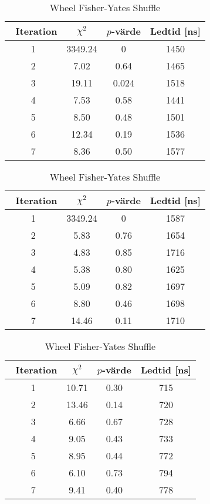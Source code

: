\begin{table}[H]
	\vspace{2em}

	\begin{subtable}[h]{0.45\textwidth}
		\centering
		\caption{\gls{soc} Pile Shuffle}
		\label{tab:soc}
		\begin{tabular}{c|c|c|c}
			$\phantom{\bigg|}$ Iteration & $\chi^2$  & \(p\)-värde & Ledtid [ns]

			\\ \hline \hline
			1 & 3349.24 & 0 & 1450 
			\\ \hline
			2 & 7.02 & 0.64 & 1465 
			\\ \hline
			3 & 19.11 & 0.024 & 1518
			\\ \hline
			4 & 7.53 & 0.58 & 1441 
			\\ \hline
			5 & 8.50 & 0.48 & 1501 
			\\ \hline
			6 & 12.34 & 0.19 & 1536 
			\\ \hline
			7 & 8.36 & 0.50 & 1577 
		\end{tabular}
	\end{subtable}
	\hfill
	\begin{subtable}[h]{0.45\textwidth}
		\centering
		\caption{Ten Pile Shuffle}
		\label{tab:ten}
		\begin{tabular}{c|c|c|c}
			$\phantom{\bigg|}$ Iteration & $\chi^2$  & \(p\)-värde & Ledtid [ns]

			\\ \hline \hline
			1 & 3349.24 & 0 & 1587 
			\\ \hline
			2 & 5.83 & 0.76 & 1654 
			\\ \hline
			3 & 4.83 & 0.85 & 1716
			\\ \hline
			4 & 5.38 & 0.80 & 1625 
			\\ \hline
			5 & 5.09 & 0.82 & 1697 
			\\ \hline
			6 & 8.80 & 0.46 & 1698 
			\\ \hline
			7 & 14.46 & 0.11 & 1710 
		\end{tabular}
	\end{subtable}
	\vspace{2em}

	\begin{subtable}[h]{0.45\textwidth}
		\centering
		\caption{Wheel Fisher-Yates Shuffle}
		\label{tab:wheel}
		\begin{tabular}{c|c|c|c}
			$\phantom{\bigg|}$ Iteration & $\chi^2$  & \(p\)-värde & Ledtid [ns]

			\\ \hline \hline
			1 & 10.71 & 0.30 & 715 
			\\ \hline
			2 & 13.46 & 0.14 & 720 
			\\ \hline
			3 & 6.66 & 0.67 & 728
			\\ \hline
			4 & 9.05 & 0.43 & 733 
			\\ \hline
			5 & 8.95 & 0.44 & 772 
			\\ \hline
			6 & 6.10 & 0.73 & 794 
			\\ \hline
			7 & 9.41 & 0.40 & 778 
		\end{tabular}
	\end{subtable}
\end{table}

